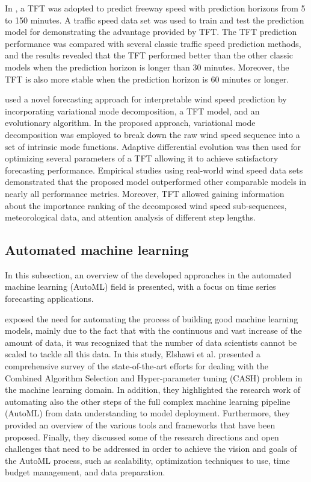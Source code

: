 In \cite{ZHANG2022329}, a TFT was adopted to predict freeway speed with prediction horizons from 5 to 150 minutes.
A traffic speed data set was used to train and test the prediction model for demonstrating the advantage provided by TFT.
The TFT prediction performance was compared with several classic traffic speed prediction methods, and the results revealed that the TFT performed better than the other classic models when the prediction horizon is longer than 30 minutes.
Moreover, the TFT is also more stable when the prediction horizon is 60 minutes or longer.

\cite{WU2022123990} used a novel forecasting approach for interpretable wind speed prediction by incorporating variational mode decomposition, a TFT model, and an evolutionary algorithm.
In the proposed approach, variational mode decomposition was employed to break down the raw wind speed sequence into a set of intrinsic mode functions.
Adaptive differential evolution was then used for optimizing several parameters of a TFT allowing it to achieve satisfactory forecasting performance.
Empirical studies using real-world wind speed data sets demonstrated that the proposed model outperformed other comparable models in nearly all performance metrics.
Moreover, TFT allowed gaining information about the importance ranking of the decomposed wind speed sub-sequences, meteorological data, and attention analysis of different step lengths.


\vspace{0.1 cm}
\subsection{Automated machine learning}
\label{sec:automl}
\vspace{0.1 cm}

In this subsection, an overview of the developed approaches in the automated machine learning (AutoML) field is presented, with a focus on time series forecasting applications.

\cite{Elshawi2019} exposed the need for automating the process of building good machine learning models, mainly due to the fact that with the continuous and vast increase of the amount of data, it was recognized that the number of data scientists cannot be scaled to tackle all this data.
In this study, Elshawi et al. presented a comprehensive survey of the state-of-the-art efforts for dealing with the Combined Algorithm Selection and Hyper-parameter tuning (CASH) problem in the machine learning domain.
In addition, they highlighted the research work of automating also the other steps of the full complex machine learning pipeline (AutoML) from data understanding to model deployment.
Furthermore, they provided an overview of the various tools and frameworks that have been proposed.
Finally, they discussed some of the research directions and open challenges that need to be addressed in order to achieve the vision and goals of the AutoML process, such as scalability, optimization techniques to use, time budget management, and data preparation.

